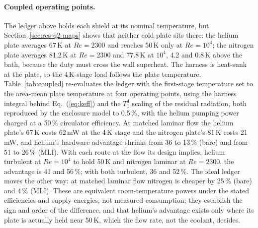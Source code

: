 \documentclass[preprint,12pt]{elsarticle}
\renewcommand{\Re}{\mathit{Re}}
\begin{document}
\paragraph{Coupled operating points.} The ledger above holds each shield at its nominal
temperature, but Section~\ref{sec:res-q2-maps} shows that neither cold plate sits there: the
helium plate averages 67\,K at $\Re=2300$ and reaches 50\,K only at $\Re=10^4$; the nitrogen
plate averages 81.2\,K at $\Re=2300$ and 77.8\,K at $10^4$, 4.2 and 0.8\,K above the bath,
because the duty must cross the wall superheat. The harness is heat-sunk at the plate, so the
4\,K-stage load follows the plate temperature. Table~\ref{tab:coupled} re-evaluates the ledger
with the first-stage temperature set to the area-mean plate temperature at four operating
points, using the harness integral behind Eq.~(\ref{eq:keff}) and the $T_1^4$ scaling of the
residual radiation, both reproduced by the enclosure model to 0.5\,\%, with the helium pumping
power charged at a 50\,\% circulator efficiency. At matched laminar flow the helium plate's
67\,K costs 62\,mW at the 4\,K stage and the nitrogen plate's 81\,K costs 21\,mW, and helium's
hardware advantage shrinks from 36 to 13\,\% (bare) and from 51 to 26\,\% (MLI). With each
route at the flow its design implies, helium turbulent at $\Re=10^4$ to hold 50\,K and
nitrogen laminar at $\Re=2300$, the advantage is 41 and 56\,\%; with both turbulent, 36 and
52\,\%. The ideal ledger moves the other way: at matched laminar flow nitrogen is cheaper by
25\,\% (bare) and 4\,\% (MLI). These are equivalent room-temperature powers under the stated
efficiencies and supply energies, not measured consumption; they establish the sign and order
of the difference, and that helium's advantage exists only where its plate is actually held
near 50\,K, which the flow rate, not the coolant, decides.
\end{document}
